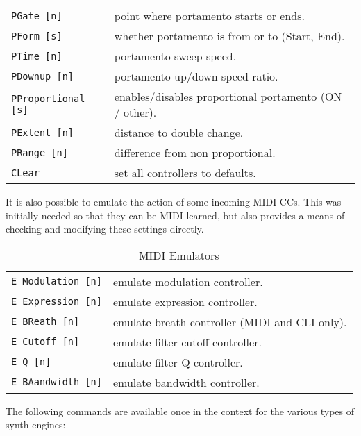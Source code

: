 \begin{table}[H]
\begin{tabular}{l l}
\texttt{PGate [n]} &
   point where portamento starts or ends. \\
\texttt{PForm [s]} &
   whether portamento is from or to (Start, End). \\
\texttt{PTime [n]} &
   portamento sweep speed. \\
\texttt{PDownup [n]} &
   portamento up/down speed ratio. \\
\texttt{PProportional [s]} &
   enables/disables proportional portamento (ON / other). \\
\texttt{PExtent [n]} &
   distance to double change. \\
\texttt{PRange [n]} &
   difference from non proportional. \\
\texttt{CLear} &
   set all controllers to defaults. \\
      \end{tabular}
   \end{table}

   It is also possible to emulate the action of some incoming MIDI CCs. This
   was initially needed so that they can be MIDI-learned, but also provides
   a means of checking and modifying these settings directly.

   \begin{table}[H]
      \centering
      \caption{MIDI Emulators}
      \label{table:yoshimi_part_midi_emulators}
      \begin{tabular}{l l}
\texttt{E Modulation [n]} &
   emulate modulation controller. \\
\texttt{E Expression [n]} &
   emulate expression controller. \\
\texttt{E BReath [n]} &
   emulate breath controller (MIDI and CLI only). \\
\texttt{E Cutoff [n]} &
   emulate filter cutoff controller. \\
\texttt{E Q [n]} &
   emulate filter Q controller. \\
\texttt{E BAandwidth [n]} &
   emulate bandwidth controller. \\
      \end{tabular}
   \end{table}

   The following commands are available once in the context for the various
   types of synth engines:


